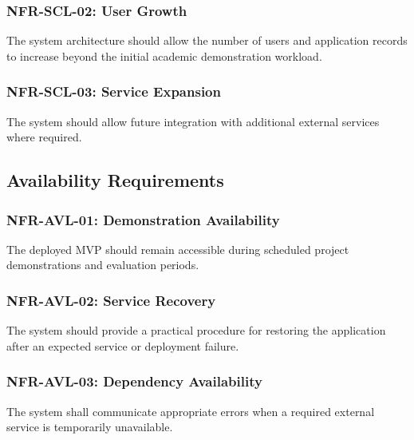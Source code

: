 \subsubsection{NFR-SCL-02: User Growth}

The system architecture should allow the number of users and application
records to increase beyond the initial academic demonstration workload.

\subsubsection{NFR-SCL-03: Service Expansion}

The system should allow future integration with additional external
services where required.



\subsection{Availability Requirements}

\subsubsection{NFR-AVL-01: Demonstration Availability}

The deployed MVP should remain accessible during scheduled project
demonstrations and evaluation periods.

\subsubsection{NFR-AVL-02: Service Recovery}

The system should provide a practical procedure for restoring the
application after an expected service or deployment failure.

\subsubsection{NFR-AVL-03: Dependency Availability}

The system shall communicate appropriate errors when a required external
service is temporarily unavailable.



